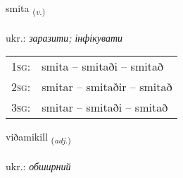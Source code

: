 \documentclass[frontgrid, backgrid]{flacards}\usepackage[]{graphicx}\usepackage[]{xcolor}
\begin{document}
\renewcommand{\flhead}{\vskip5pt \fboxsep=0pt {\small\bfseries\footnotesize Sagnorð | дієслово}}
\renewcommand{\fcfoot}{\vskip5pt \fboxsep=0pt \hspace{2pt}{\small\bfseries\footnotesize 3K}}

\renewcommand{\blhead}{\vskip5pt {\small\bfseries\footnotesize Sagnorð | дієслово }}
\renewcommand{\bcfoot}{\vskip5pt \hspace{2pt}{\small\bfseries\footnotesize 3K}}


{smita \small{\textsubscript{(\textit{v.})}} \\[1ex] %
\textphonetic{[smɪːta]} \\
ukr.: \emph{заразити; інфікувати} \\  [2ex]
\renewcommand*{\arraystretch}{0.8}
\begin{tabular}{p{1cm}l}
\textsc{1sg}: & smita -- smitaði -- smitað \\ 
\textsc{2sg}: & smitar -- smitaðir -- smitað \\ 
\textsc{3sg}: & smitar -- smitaði -- smitað \\ 
\end{tabular}
}

\renewcommand{\flhead}{\vskip5pt \fboxsep=0pt {\small\bfseries\footnotesize Lýsingarorð | прикметник}}
\renewcommand{\fcfoot}{\vskip5pt \fboxsep=0pt \hspace{2pt}{\small\bfseries\footnotesize 3K}}

\renewcommand{\blhead}{\vskip5pt {\small\bfseries\footnotesize Lýsingarorð | прикметник }}
\renewcommand{\bcfoot}{\vskip5pt \hspace{2pt}{\small\bfseries\footnotesize 3K}}


{viðamikill \small{\textsubscript{(\textit{adj.})}} \\[1ex] %
\textphonetic{[vɪːðamɪcɪtl̥]} \\
ukr.: \emph{обширний} \\  [2ex]
\renewcommand*{\arraystretch}{0.8}
}
\end{document}
